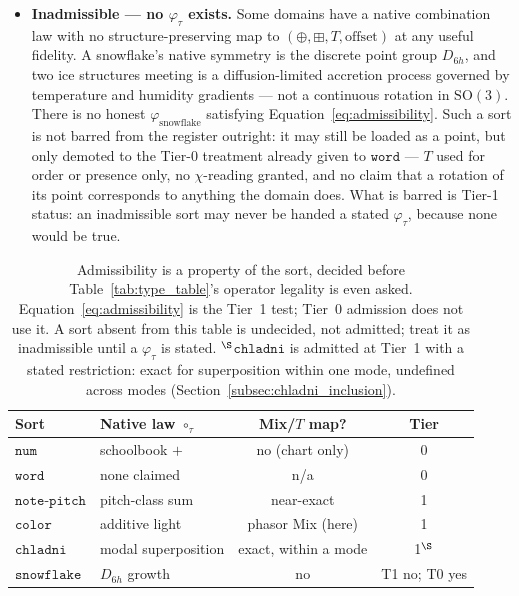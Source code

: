 \documentclass[12pt, a4paper]{article}
\begin{document}
\begin{itemize}
    \item \textbf{Inadmissible --- no $\varphi_\tau$ exists.} Some
    domains have a native combination law with no structure-preserving
    map to $(\oplus,\boxplus,T,\text{offset})$ at any useful fidelity.
    A snowflake's native symmetry is the discrete point group
    $D_{6h}$, and two ice structures meeting is a diffusion-limited
    accretion process governed by temperature and humidity gradients
    --- not a continuous rotation in $\mathrm{SO}(3)$. There is no
    honest $\varphi_{\mathrm{snowflake}}$ satisfying
    Equation~\eqref{eq:admissibility}. Such a sort is not barred from
    the register outright: it may still be loaded as a point, but
    only demoted to the Tier-0 treatment already given to
    $\mathtt{word}$ --- $T$ used for order or presence only, no
    $\chi$-reading granted, and no claim that a rotation of its point
    corresponds to anything the domain does. What is barred is Tier-1
    status: an inadmissible sort may never be handed a stated
    $\varphi_\tau$, because none would be true.
\end{itemize}

\begin{table}[h]
\centering
\begin{tabular}{llcc}
\hline
Sort & Native law $\circ_\tau$ & Mix/$T$ map? & Tier \\
\hline
$\mathtt{num}$   & schoolbook $+$ & no (chart only) & 0 \\
$\mathtt{word}$  & none claimed & n/a & 0 \\
$\mathtt{note\text{-}pitch}$ & pitch-class sum & near-exact & 1 \\
$\mathtt{color}$ & additive light & phasor Mix (here) & 1 \\
$\mathtt{chladni}$ & modal superposition & exact, within a mode & 1$^{\S}$ \\
$\mathtt{snowflake}$ & $D_{6h}$ growth & no & T1 no; T0 yes \\
\hline
\end{tabular}
\caption{Admissibility is a property of the sort, decided before
Table~\ref{tab:type_table}'s operator legality is even asked.
Equation~\eqref{eq:admissibility} is the Tier~1 test; Tier~0
admission does not use it. A sort
absent from this table is undecided, not admitted; treat it as
inadmissible until a $\varphi_\tau$ is stated.
$^{\S}$$\mathtt{chladni}$ is admitted at Tier~1 with a stated
restriction: exact for superposition within one mode, undefined across
modes (Section~\ref{subsec:chladni_inclusion}).}
\label{tab:admissibility}
\end{table}
\end{document}
